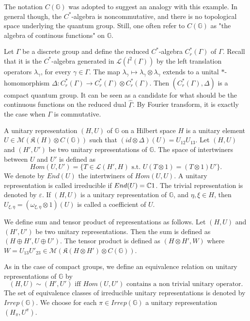 The notation $C(\mathbb G)$ was adopted to suggest an analogy with this example. In general though, the $C^*$-algebra is noncommutative, and there is no topological space underlying the quantum group. Still, one often refer to $C(\mathbb G)$ as "the algebra of continous functions" on $\mathbb G$.

\begin{Expl}
Let $\Gamma$ be a discrete group and define the reduced $C^*$-algebra $C_r^*(\Gamma)$ of $\Gamma$. Recall that it is the $C^*$-algebra generated in $\mathcal L(l^2(\Gamma))$ by the left translation operators $\lambda_\gamma$, for every $\gamma\in\Gamma$. The map $ \lambda_\gamma \mapsto \lambda_\gamma\otimes \lambda_\gamma$ extends to a unital $*$-homomorphism $\Delta :C_r^*(\Gamma)\rightarrow C_r^*(\Gamma)\otimes C_r^*(\Gamma) $. Then $(C_r^*(\Gamma),\Delta)$ is a compact quantum group. It can be seen as a candidate for what should be the continuous functions on the reduced dual $\hat\Gamma$. By Fourier transform, it is exactly the case when $\Gamma$ is commutative.
\end{Expl}

\begin{definition} A unitary representation $(H,U)$ of $\mathbb G$ on a Hilbert space $H$ is a unitary element $U \in \mathcal M(\mathfrak K(H)\otimes C(\mathbb G))$ such that $(id\otimes\Delta)(U) = U_{12}U_{13}$. Let $(H,U)$ and $(H',U')$ be two unitary representations of $\mathbb G$. The space of intertwiners between $U$ and $U'$ is defined as 
\[Hom(U,U') = \{T\in \mathcal L(H',H) \text{ s.t. }U(T\otimes 1) = (T\otimes 1) U' \}.\]
We denote by $End(U)$ the intertwiners of $Hom(U,U)$. A unitary representation is called irreducible if $End(U) = \mathbb C 1$. The trivial representation is denoted by $\varepsilon$. If $(H,U)$ is a unitary representation of $\mathbb G$, and $\eta,\xi\in H$, then $U_{\xi,\eta} = (\omega_{\xi,\eta}\otimes 1)( U )$ is called a coefficient of $U$.
\end{definition}

We define sum and tensor product of representations as follows. Let $(H,U)$ and $(H',U')$ be two unitary representations. Then the sum is defined as $(H\oplus H', U\oplus U')$. The tensor product is defined as $(H\otimes H',W)$ where $W = U_{13} U'_{23}\in \mathcal M(\mathfrak K(H\otimes H')\otimes C(\mathbb G))$. 

\begin{definition}
As in the case of compact groups, we define an equivalence relation on unitary representations of $\mathbb G$ by 
\[(H,U)\sim (H',U') \text{ iff } Hom(U,U') \text{ contains a non trivial unitary operator}.\]
The set of equivalence classes of irreducible unitary representations is denoted by $Irrep(\mathbb G)$. We choose for each $\pi\in Irrep (\mathbb G)$ a unitary representation $(H_\pi, U^{\pi})$. 
\end{definition}


